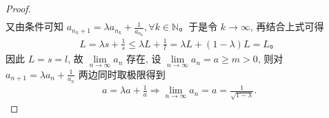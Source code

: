 \documentclass[../../main.tex]{subfiles}%
\begin{document}
\begin{proof}
\begin{align*}
\end{align*}
又由条件可知 $a_{n_k+1}=\lambda a_{n_k}+\frac{1}{a_{n_k}},\forall k\in \mathbb{N}$。于是令 $k\rightarrow \infty$, 再结合上式可得
\begin{align*}
L=\lambda s+\frac{1}{s}\leqslant \lambda L+\frac{1}{l}=\lambda L+\left( 1-\lambda \right) L=L。
\end{align*}
因此 $L=s=l$, 故 $\underset{n\rightarrow \infty}{\lim}a_n$ 存在, 设 $\underset{n\rightarrow \infty}{\lim}a_n=a\geqslant m>0$, 则对 $a_{n+1}=\lambda a_n+\frac{1}{a_n}$ 两边同时取极限得到
\begin{align*}
a=\lambda a+\frac{1}{a}\Rightarrow \underset{n\rightarrow \infty}{\lim}a_n=a=\frac{1}{\sqrt{1-\lambda}}.
\end{align*}
\end{proof}
\end{document}
